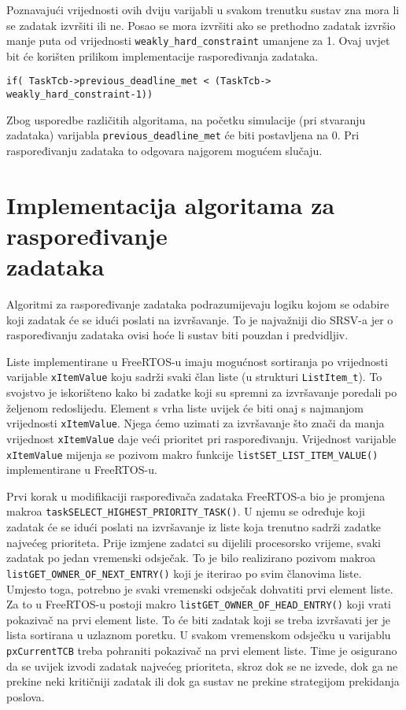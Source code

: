 \documentclass[../zavrsni.tex]{subfiles}
\begin{document}
Poznavajući vrijednosti ovih dviju varijabli u svakom trenutku sustav zna mora li se zadatak izvršiti ili ne. Posao se mora izvršiti
ako se prethodno zadatak izvršio manje puta od vrijednosti \texttt{weakly\_hard\_constraint} umanjene za 1. Ovaj uvjet bit će 
korišten prilikom implementacije raspoređivanja zadataka.

\begin{lstlisting}[style=CStyle,caption={Uvjet za slučaj kada se zadatak mora izvršiti},captionpos=b]
if( TaskTcb->previous_deadline_met < (TaskTcb->
weakly_hard_constraint-1))
\end{lstlisting}

Zbog usporedbe različitih algoritama, na početku simulacije (pri stvaranju zadataka) varijabla \texttt{previous\_deadline\_met} će 
biti postavljena na 0. Pri raspoređivanju zadataka to odgovara najgorem mogućem slučaju.

\section{Implementacija algoritama za raspoređivanje \\zadataka}

Algoritmi za raspoređivanje zadataka podrazumijevaju logiku kojom se odabire koji zadatak će se idući poslati na izvršavanje.
To je najvažniji dio SRSV-a jer o raspoređivanju zadataka ovisi hoće li sustav biti pouzdan i predvidljiv.

Liste implementirane u FreeRTOS-u imaju mogućnost sortiranja po vrijednosti varijable \texttt{xItemValue} koju sadrži svaki član liste 
(u strukturi \texttt{ListItem\_t}). To svojstvo je iskorišteno kako bi zadatke koji su spremni za izvršavanje poredali po željenom 
redoslijedu. Element s vrha liste uvijek će biti onaj s najmanjom vrijednosti \texttt{xItemValue}. Njega ćemo uzimati za izvršavanje 
 što znači da manja vrijednost \texttt{xItemValue} daje veći prioritet pri raspoređivanju.
Vrijednost varijable \texttt{xItemValue} mijenja se pozivom makro funkcije \texttt{listSET\_LIST\_ITEM\_VALUE()} 
implementirane u FreeRTOS-u.

Prvi korak u modifikaciji raspoređivača zadataka FreeRTOS-a bio je promjena makroa \texttt{taskSELECT\_HIGHEST\_PRIORITY\_TASK()}.
U njemu se određuje koji zadatak će se idući poslati na izvršavanje iz liste koja trenutno sadrži zadatke najvećeg prioriteta.
Prije izmjene zadatci su dijelili procesorsko vrijeme, svaki zadatak po jedan vremenski odsječak. To je bilo realizirano pozivom
makroa \texttt{listGET\_OWNER\_OF\_NEXT\_ENTRY()} koji je iterirao po svim članovima liste. Umjesto toga, potrebno je svaki vremenski odsječak
dohvatiti prvi element liste. Za to u FreeRTOS-u postoji makro \texttt{listGET\_OWNER\_OF\_HEAD\_ENTRY()} koji vrati pokazivač na 
prvi element liste. To će biti zadatak koji se treba izvršavati jer je lista sortirana u uzlaznom poretku. 
U svakom vremenskom odsječku u varijablu \texttt{pxCurrentTCB} treba pohraniti pokazivač na prvi element liste. Time je osigurano da
se uvijek izvodi zadatak najvećeg prioriteta, skroz dok se ne izvede, dok ga ne prekine neki kritičniji zadatak ili dok ga sustav 
ne prekine strategijom prekidanja poslova.
\end{document}
